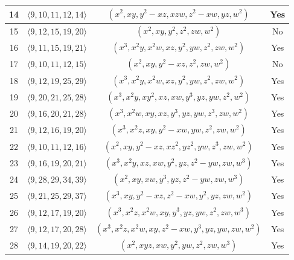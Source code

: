\documentclass{amsart}
\theoremstyle{plain}
\theoremstyle{definition}
\numberwithin{theorem}{section}
\numberwithin{equation}{section}
\numberwithin{equation}{theorem}
\begin{document}
\begin{longtable}{|c|c|c|c|}
\hline
14 & $\langle 9, 10, 11, 12, 14\rangle$  & $(x^2, xy, y^2-xz, xzw, z^2-xw, yz, w^2)$ & Yes\\

\hline
15 & $\langle 9, 12, 15, 19, 20\rangle$  & $(x^2, xy, y^2, z^2, zw, w^2)$ & No\\

\hline
16 & $\langle 9, 11, 15, 19, 21\rangle$  & $(x^3, x^2y, x^2w, xz, y^2, yw, z^2, zw, w^2)$ & Yes\\

\hline
17 & $\langle 9, 10, 11, 12, 15\rangle$  & $(x^2, xy, y^2-xz, z^2, zw, w^2)$ & No\\

\hline
18 & $\langle 9, 12, 19, 25, 29\rangle$ & $(x^3, x^2y, x^2w, xz, y^2, yw, z^2, zw, w^2)$ & Yes\\

\hline
19 & $\langle 9, 20, 21, 25, 28\rangle$ & $(x^3, x^2y, xy^2, xz, xw, y^3, yz, yw, z^2, w^2)$ & Yes\\

\hline
20 & $\langle 9, 16, 20, 21, 28\rangle$ & $(x^3, x^2w, xy, xz, y^3, yz, yw, z^3, zw, w^2)$ & Yes\\

\hline
21 & $\langle 9,12, 16, 19, 20\rangle$ & $(x^3, x^2z, xy, y^2-xw, yw, z^2, zw, w^2)$ & Yes\\

\hline
22 & $\langle 9,10, 11, 12, 16\rangle$ & $(x^2, xy, y^2-xz, xz^2, yz^2, yw, z^3, zw, w^2)$ & Yes\\

\hline
23 & $\langle 9,16, 19, 20, 21\rangle$ & $(x^3, x^2y, xz, xw, y^2, yz, z^2-yw, zw, w^3)$ & Yes\\

\hline
24 & $\langle 9,28, 29, 34, 39\rangle$ & $(x^2, xy, xw, y^3, yz, z^2-yw, zw, w^3)$ & Yes\\

\hline
25 & $\langle 9,21, 25, 29, 37\rangle$ & $(x^3, xy, y^2-xz, z^2-xw, y^2, yz, zw, w^2)$ & Yes\\

\hline
26 & $\langle 9,12, 17, 19, 20\rangle$ & $(x^3, x^2z, x^2w, xy, y^3, yz, yw, z^2, zw, w^3)$ & Yes\\

\hline
27 & $\langle 9,12, 17, 20, 28\rangle$ & $(x^3, x^2z, x^2w, xy, z^2-xw, y^3, yz, yw, zw, w^2)$ & Yes\\

\hline
28 & $\langle 9,14, 19, 20, 22\rangle$ & $(x^2, xyz, xw, y^2, yw, z^2, zw, w^3)$ & Yes\\


\end{longtable}
\end{document}
